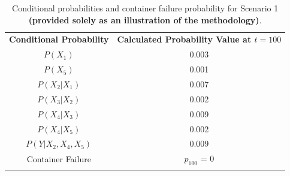 \begin{table}[htbp]
\begin{center}
    \begin{tabular}{cc} \Xhline{2\arrayrulewidth}
     \textbf{Conditional Probability}          & \textbf{Calculated Probability Value at $t=100$} \\\Xhline{2\arrayrulewidth}
    $P(X_1)$                            & 0.003                                     \\
    $P(X_5)$                            & 0.001                                   \\
    $P(X_2|X_1)$                         & 0.007                                   \\
    $P(X_3|X_2)$                         & 0.002                                   \\
    $P(X_4|X_3)$                         & 0.009                                   \\
    $P(X_4|X_5)$                         & 0.002                                   \\
    $P(Y|X_2,X_4,X_5)$                    & 0.009                                   \\ \hline
    Container Failure & $p_{100}$  = 0                                 \\\Xhline{2\arrayrulewidth}
    \end{tabular}
            \small\caption{Conditional probabilities and container failure probability for Scenario 1 \textbf{(provided solely as an illustration of the methodology)}.}\normalsize
    \label{table:time100_probs}
\end{center}
\end{table}

